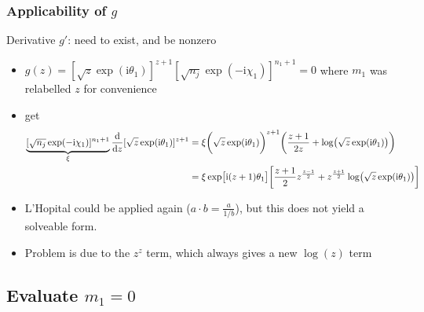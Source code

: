 \documentclass[
	english,
	a4paper,
	fontsize=10pt,
	parskip=half,
	titlepage=true,
	DIV=12,
	final
]{scrreprt}
\newcommand*{\iunit}{\ensuremath{\mathrm{i}}}
\begin{document}
\subsubsection{Applicability of $g$}
Derivative $g'$: need to exist, and be nonzero
\begin{itemize}
\item $g(z) = [\sqrt{z} \exp( \iunit \theta_1)]^{z + 1}
			 [\sqrt{n_j} \exp(-\iunit \chi  _1)]^{n_1 + 1} = 0$
	where $m_1$ was relabelled $z$ for convenience
\item get
\begin{align}
	\underbrace{
		[\sqrt{n_j} \exp(-\iunit \chi  _1)]^{n_1 + 1}
	}_{\xi}
	\dv{z}
		[\sqrt{z} \exp( \iunit \theta_1)]^{z + 1}
&=
	\xi
	\qty( \bigg.
		\sqrt{z} \exp( \iunit \theta_1)
	)^{z+1}
	\qty(
		\frac
			{z+1}
			{2z}
		+
		\log(\sqrt{z} \exp( \iunit \theta_1) )
	) \\
&=
	\xi
	\exp[ \big. \iunit (z+1) \theta_1 ]
	\qty[
		\frac{z+1}{2}
		z^{\frac{z-1}{2}}
		+
		z^{\frac{z+1}{2}}
		\log(\sqrt{z} \exp( \iunit \theta_1) )
	]
\end{align}

\item L'Hopital could be applied again ($a \cdot b = \frac{a}{1/b}$), but this does not yield a solveable form.
\item Problem is due to the $z^z$ term, which always gives a new $\log(z)$ term
\end{itemize}		


\subsection{Evaluate $m_1 = 0$}
\end{document}
